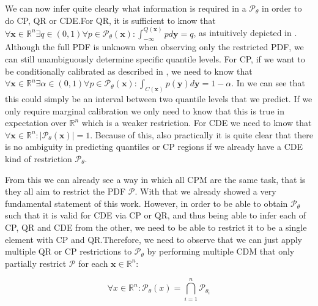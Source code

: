 We can now infer quite clearly what information is required in a $\mathscr{P}_{\theta}$ in order to do CP, QR or CDE.\@ For QR, it is sufficient to know that
$\forall \mathbf{x} \in \mathbb{R}^n \exists q \in (0,1) \forall p\in \mathscr{P}_{\theta}(\mathbf{x}): \int_{-\infty}^{Q(\mathbf{x})} p d\mathbf{y} = q$, as intuitively depicted in . Although the full PDF is unknown when observing only the restricted PDF, we can still unambiguously determine specific quantile levels. For CP, if we want to be conditionally calibrated as described in , we need to know that $\forall \mathbf{x} \in \mathbb{R}^n \exists \alpha \in (0,1) \forall p\in \mathscr{P}_{\theta}(\mathbf{x}): \int_{C(\mathbf{x})} p(\mathbf{y}) d\mathbf{y} = 1 - \alpha$. In  we can see that this could simply be an interval between two quantile levels that we predict. If we only require marginal calibration we only need to know that this is true in expectation over $\mathbb{R}^n$ which is a weaker restriction. For CDE we need to know that $\forall \mathbf{x} \in \mathbb{R}^n: |\mathscr{P}_{\theta}(\mathbf{x})| = 1$. Because of this, also practically it is quite clear that there is no ambiguity in predicting quantiles or CP regions if we already have a CDE kind of restriction $\mathscr{P}_\theta$.

From this we can already see a way in which all CPM are the same task, that is they all aim to restrict the PDF $\mathcal{P}$. With that we already showed a very fundamental statement of this work. However, in order to be able to obtain $\mathscr{P}_\theta$ such that it is valid for CDE via CP or QR, and thus being able to infer each of CP, QR and CDE from the other, we need to be able to restrict it to be a single element with CP and QR.\@ Therefore, we need to observe that we can just apply multiple QR or CP restrictions to $\mathscr{P}_\theta$ by performing multiple CDM that only partially restrict $\mathcal{P}$ for each $\mathbf{x}\in\mathbb{R}^n$:

\begin{equation}
    \forall x\in\mathbb{R}^n: \mathscr{P}_{\theta}(x) = \bigcap_{i=1}^n \mathscr{P}_{\theta_i}
\end{equation}

